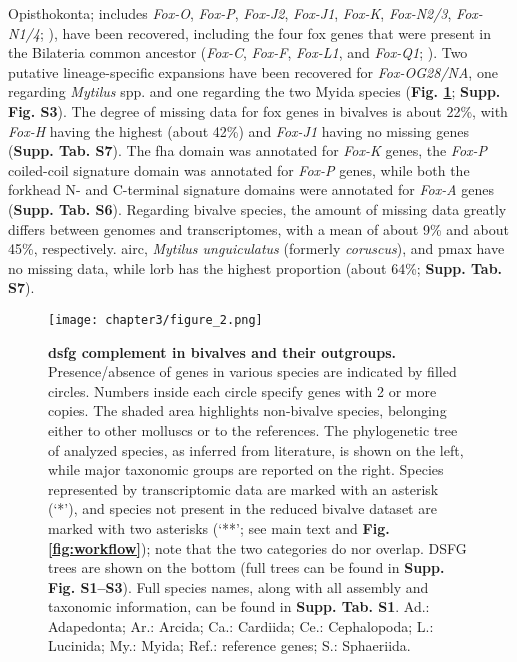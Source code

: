 \documentclass[../main.tex]{subfiles}
\begin{document}
Opisthokonta; includes \textit{Fox-O}, \textit{Fox-P}, \textit{Fox-J2}, \textit{Fox-J1}, \textit{Fox-K}, \textit{Fox-N2/3}, \textit{Fox-N1/4}; \textbf{\cite{larroux2008genesis}}), have been recovered, including the four \gls{fox} genes that were present in the Bilateria common ancestor (\textit{Fox-C}, \textit{Fox-F}, \textit{Fox-L1}, and \textit{Fox-Q1}; \textbf{\cite{shimeld2010clustered}}). Two putative lineage-specific expansions have been recovered for \textit{Fox-OG28/NA}, one regarding \textit{Mytilus} spp. and one regarding the two Myida species (\textbf{Fig. \ref{fig:DSFG_bivalveCompilation}}; \textbf{Supp. Fig. S3}). The degree of missing data for \gls{fox} genes in bivalves is about 22\%, with \textit{Fox-H} having the highest (about 42\%) and \textit{Fox-J1} having no missing genes (\textbf{Supp. Tab. S7}). The \gls{fha} domain was annotated for \textit{Fox-K} genes, the \textit{Fox-P} coiled-coil signature domain was annotated for \textit{Fox-P} genes, while both the forkhead N- and C-terminal signature domains were annotated for \textit{Fox-A} genes (\textbf{Supp. Tab. S6}).
Regarding bivalve species, the amount of missing data greatly differs between genomes and transcriptomes, with a mean of about 9\% and about 45\%, respectively. \gls{airc}, \textit{Mytilus unguiculatus} (formerly \textit{coruscus}), and \gls{pmax} have no missing data, while \gls{lorb} has the highest proportion (about 64\%; \textbf{Supp. Tab. S7}).


\begin{figure}
	\centering
	\texttt{[image: chapter3/figure\_2.png]}
	\captionsetup{width=\textwidth}
	\caption{
		\textbf{\gls{dsfg} complement in bivalves and their outgroups.} Presence/absence of genes in various species are indicated by filled circles. Numbers inside each circle specify genes with 2 or more copies. The shaded area highlights non-bivalve species, belonging either to other molluscs or to the references. The phylogenetic tree of analyzed species, as inferred from literature, is shown on the left, while major taxonomic groups are reported on the right. Species represented by transcriptomic data are marked with an asterisk (‘*’), and species not present in the reduced bivalve dataset are marked with two asterisks (‘**’; see main text and \textbf{Fig. \ref{fig:workflow}}); note that the two categories do nor overlap. DSFG trees are shown on the bottom (full trees can be found in \textbf{Supp. Fig. S1--S3}). Full species names, along with all assembly and taxonomic information, can be found in \textbf{Supp. Tab. S1}.  Ad.: Adapedonta; Ar.: Arcida; Ca.: Cardiida; Ce.: Cephalopoda; L.: Lucinida; My.: Myida; Ref.: reference genes; S.: Sphaeriida.
	}
	\label{fig:DSFG_bivalveCompilation}
\end{figure}
\end{document}
